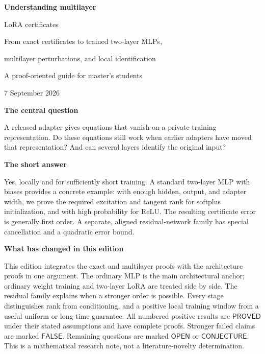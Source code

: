 \documentclass[12pt,a4paper]{article}
\theoremstyle{readable}
\theoremstyle{definition}\newtheorem{example}[theorem]{Example}
\newcommand{\PP}{\mathsf{PROVED}}\newcommand{\FF}{\mathsf{FALSE}}
\newcommand{\OO}{\mathsf{OPEN}}\newcommand{\CC}{\mathsf{CONJECTURE}}
\begin{document}
\hypersetup{pageanchor=false}
\begin{titlepage}
\vspace*{12mm}
{\Huge\bfseries Understanding multilayer\par LoRA certificates\par}
\vspace{8mm}
{\Large From exact certificates to trained two-layer MLPs,\par multilayer perturbations, and local identification}\par
\vspace{10mm}
{\large A proof-oriented guide for master's students}\par
7 September 2026\par
\vspace{12mm}
\textbf{The central question}

A released adapter gives equations that vanish on a private training representation. Do these equations still work when earlier adapters have moved that representation? And can several layers identify the original input?

\textbf{The short answer}

Yes, locally and for sufficiently short training. A standard two-layer MLP with biases provides a concrete example: with enough hidden, output, and adapter width, we prove the required excitation and tangent rank for softplus initialization, and with high probability for ReLU. The resulting certificate error is generally first order. A separate, aligned residual-network family has special cancellation and a quadratic error bound.

\textbf{What has changed in this edition}

This edition integrates the exact and multilayer proofs with the architecture proofs in one argument. The ordinary MLP is the main architectural anchor; ordinary weight training and two-layer LoRA are treated side by side. The residual family explains when a stronger order is possible. Every stage distinguishes rank from conditioning, and a positive local training window from a useful uniform or long-time guarantee.
\vfill
All numbered positive results are \(\PP\) under their stated assumptions and have complete proofs. Stronger failed claims are marked \(\FF\). Remaining questions are marked \(\OO\) or \(\CC\). This is a mathematical research note, not a literature-novelty determination.
\end{titlepage}
\hypersetup{pageanchor=true}
\begingroup\small{}\setlength{\parskip}{0pt}\tableofcontents\endgroup\newpage
{}
\end{document}
